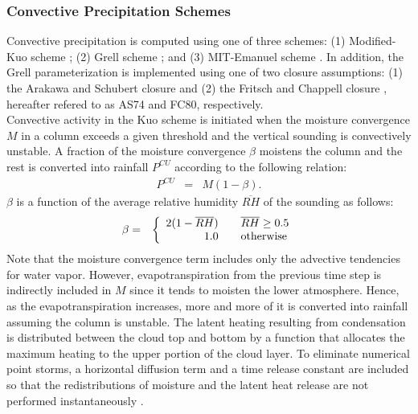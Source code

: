 \subsubsection{Convective Precipitation Schemes}

Convective precipitation is computed using one of three schemes: (1)
Modified-Kuo scheme \cite{Anthes_77}; (2) Grell scheme \cite{Grell_93}; and (3)
MIT-Emanuel scheme \citep{Emanuel_91,Emanuel_99}. In addition, the Grell
parameterization is implemented using one of two closure assumptions: (1) the
Arakawa and Schubert closure \cite{Grell_94} and (2) the Fritsch and Chappell
closure \cite{Fritsch_80}, hereafter refered to as AS74 and FC80,
respectively.\\

  Convective activity in the Kuo scheme is
initiated when the moisture convergence $M$ in a column exceeds a given
threshold and the vertical sounding is convectively unstable. A fraction of the
moisture convergence $\beta$ moistens the column and the rest is converted into
rainfall $P^{CU}$ according to the following relation: \begin{eqnarray}
P^{CU}&=&M(1-\beta).  \label{eqn_model:KUOppt} \end{eqnarray} $\beta$ is a
function of the average relative humidity $\overline{RH}$ of the sounding as
follows: \begin{eqnarray} \beta&=&\left\{ \begin{array} {r@{\quad\quad}l}
2(1-\overline{RH}) & \overline{RH}\ge 0.5 \\ 1.0 & \mbox{otherwise} \end{array}
\right.  \label{eqn_model:Bfact} \end{eqnarray} Note that the moisture
convergence term includes only the advective tendencies for water vapor.
However, evapotranspiration from the previous time step is indirectly included
in $M$ since it tends to moisten the lower atmosphere. Hence, as the
evapotranspiration increases, more and more of it is converted into rainfall
assuming the column is unstable. The latent heating resulting from condensation
is distributed between the cloud top and bottom by a function that allocates the
maximum heating to the upper portion of the cloud layer. To eliminate numerical
point storms, a horizontal diffusion term and a time release constant are
included so that the redistributions of moisture and the latent heat release are
not performed instantaneously \citep{Giorgi_89b, Giorgi_91c}. \\

